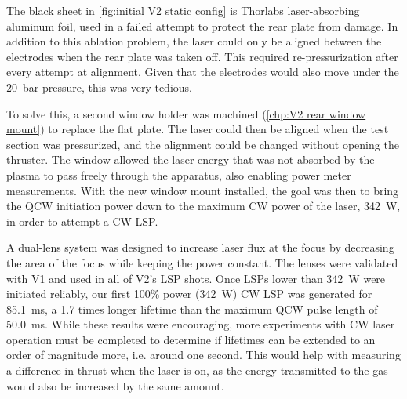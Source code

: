 The black sheet in \autoref{fig:initial V2 static config} is Thorlabs laser-absorbing aluminum foil, used in a failed attempt to protect the rear plate from damage. In addition to this ablation problem, the laser could only be aligned between the electrodes when the rear plate was taken off. This required re-pressurization after every attempt at alignment. Given that the electrodes would also move under the \qty{20}{bar} pressure, this was very tedious. 

To solve this, a second window holder was machined (\autoref{chp:V2 rear window mount}) to replace the flat plate. The laser could then be aligned when the test section was pressurized, and the alignment could be changed without opening the thruster. The window allowed the laser energy that was not absorbed by the plasma to pass freely through the apparatus, also enabling power meter measurements. With the new window mount installed, the goal was then to bring the QCW initiation power down to the maximum CW power of the laser, \qty{342}{W}, in order to attempt a CW LSP.

A dual-lens system was designed to increase laser flux at the focus by decreasing the area of the focus while keeping the power constant. The lenses were validated with V1 and used in all of V2's LSP shots. Once LSPs lower than \qty{342}{W} were initiated reliably, our first 100\% power (\qty{342}{W}) CW LSP was generated for \qty{85.1}{ms}, a 1.7 times longer lifetime than the maximum QCW pulse length of \qty{50.0}{ms}. While these results were encouraging, more experiments with CW laser operation must be completed to determine if lifetimes can be extended to an order of magnitude more, i.e. around one second. This would help with measuring a difference in thrust when the laser is on, as the energy transmitted to the gas would also be increased by the same amount.

